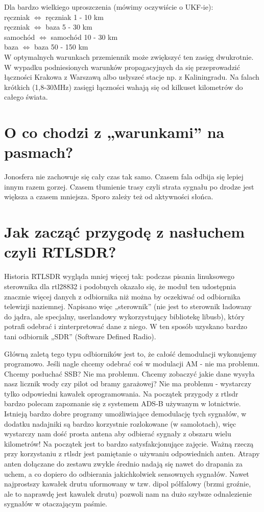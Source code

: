 \documentclass[a4paper,12pt]{article}
\begin{document}
Dla bardzo wielkiego uproszczenia (mówimy oczywiście o UKF-ie):\\
ręczniak $\Leftrightarrow$ ręczniak 1 - 10 km\\
ręczniak $\Leftrightarrow$ baza 5 - 30 km\\
samochód $\Leftrightarrow$ samochód 10 - 30 km\\
baza $\Leftrightarrow$ baza 50 - 150 km \\

W optymalnych warunkach przemiennik może zwiększyć ten zasięg dwukrotnie.
W wypadku podniesionych warunków propagacyjnych da się przeprowadzić łączności Krakowa z Warszawą albo usłyszeć stacje np. z Kaliningradu.
Na falach krótkich (1,8-30MHz) zasięgi łączności wahają się od kilkuset kilometrów do całego świata. 

\section{O co chodzi z „warunkami” na pasmach?}
Jonosfera nie zachowuje się cały czas tak samo. Czasem fala odbija się lepiej innym razem gorzej. Czasem tłumienie trasy czyli strata sygnału po drodze jest większa a czasem mniejsza. 
Sporo zależy też od aktywności słońca.

\section{Jak zacząć przygodę z nasłuchem czyli RTLSDR?}
Historia RTLSDR wygląda mniej więcej tak: podczas pisania linuksowego sterownika dla rtl28832 i podobnych okazało się, że moduł ten udostępnia znacznie więcej danych z odbiornika niż można by oczekiwać od odbiornika telewizji naziemnej. Napisano więc „sterownik” (nie jest to sterownik ładowany do jądra, ale specjalny, userlandowy wykorzystujący bibliotekę libusb), który potrafi odebrać i zinterpretować dane z niego. W ten sposób uzyskano bardzo tani odbiornik „SDR” (Software Defined Radio).

Główną zaletą tego typu odbiorników jest to, że całość demodulacji wykonujemy programowo. Jeśli nagle chcemy odebrać coś w modulacji AM - nie ma problemu. Chcemy posłuchać SSB? Nie ma problemu. Chcemy zobaczyć jakie dane wysyła nasz licznik wody czy pilot od bramy garażowej? Nie ma problemu - wystarczy tylko odpowiedni kawałek oprogramowania.
Na początek przygody z rtlsdr bardzo polecam zapoznanie się z systemem ADS-B używanym w lotnictwie. Istnieją bardzo dobre programy umożliwiające demodulację tych sygnałów, w dodatku nadajniki są bardzo korzystnie rozlokowane (w samolotach), więc wystarczy nam dość prosta antena aby odbierać sygnały z obszaru wielu kilometrów! Na początek jest to bardzo satysfakcjonujące zajęcie.
Ważną rzeczą przy korzystaniu z rtlsdr jest pamiętanie o używaniu odpowiednich anten. Atrapy anten dołączane do zestawu zwykle średnio nadają się nawet do drapania za uchem, a co dopiero do odbierania jakichkolwiek sensownych sygnałów. Nawet najprostszy kawałek drutu uformowany w tzw. dipol półfalowy (brzmi groźnie, ale to naprawdę jest kawałek drutu) pozwoli nam na dużo szybsze odnalezienie sygnałów w otaczającym paśmie.
\end{document}
